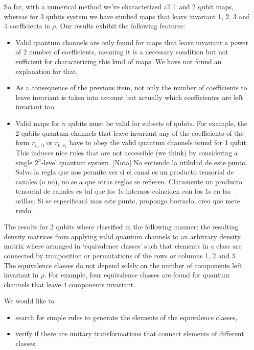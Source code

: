 \documentclass[11pt]{article}
\begin{document}
So far, with a numerical method we've characterized all 1 and 2 qubit maps, 
whereas for 3 qubits system we have studied maps that leave invariant 1, 2, 
3 and 4 coefficients in $\rho$. Our results exhibit the following features:
\begin{itemize}
	\item Valid quantum channels are only found for maps that leave invariant
				a power of 2 number of coefficients, meaning it is a necessary
				condition but not sufficient for characterizing this kind of 
				maps. We have not found an explanation for that.
				
	\item 


				As a consequence of the previous item, not only the number of 
				coefficients to leave invariant is taken into account but actually
				which coefficientes are left invariant too.
				
	\item Valid maps for $n$ qubits must be valid for subsets of qubits. For example, 
the 2-qubits quantum-channels
that leave invariant any of the coefficients of the form $r_{v_1,0}$ or
$r_{0,v_2}$ have to obey the valid quantum channels found for 1 qubit. 
This induces nice rules that are not accessible (we think) by considering 
a single $2^n$-level quantum system. {\color{red} [Nota]
No entiendo la utilidad de este punto. Salvo la regla que nos permite ver si el canal es un producto tensorial de canales (o no), no se a que otras reglas se refieren. Claramente un producto tensorial de canales es tal que los 1s internos coinciden con los 1s en las orillas. Si se especificará mas este punto, propongo borrarlo, creo que mete ruido.}
\end{itemize}

The results for 2 qubits where classified in the following manner: 
the resulting density matrices from applying valid quantum channels
to an arbitrary density matrix where arranged in `equivalence classes' 
such that elements in a class are connected by tranposition or 
permutations of the rows or columns 1, 2 and 3. The equivalence classes do not 
depend solely on the number of components left invariant in $\rho$. 
For example, four equivalence classes are found for quantum channels
that leave 4 components invariant.

We would like to
\begin{itemize}
	\item search for simple rules to generate the elements 
				of the equivalence classes,
	\item verify if there are unitary transformations that connect elements of
				different classes.
\end{itemize}


\end{document}

